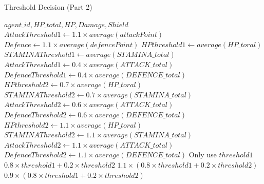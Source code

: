 \begin{algorithm}
\caption{Threshold Decision (Part 2)}\label{alg:12}
\begin{algorithmic} 
\scriptsize
\Require $agent\_id, HP\_total, HP, Damage, Shield$
\State $AttackThreshold1 \leftarrow 1.1 \times average(attackPoint)$
\State $Defence \leftarrow 1.1 \times average(defencePoint)$
\EndIf
{}
\State $HPthreshold1 \leftarrow average(HP\_toral)$
\State $STAMINAThreshold1 \leftarrow average(STAMINA\_total)$
\State $AttackThreshold1 \leftarrow 0.4 \times average(ATTACK\_total)$
\State $DefenceThreshold1 \leftarrow 0.4 \times average(DEFENCE\_total)$
\EndIf
{}
\State $HPthreshold2 \leftarrow 0.7 \times average(HP\_toral)$
\State $STAMINAThreshold2 \leftarrow 0.7 \times average(STAMINA\_total)$
\State $AttackThreshold2 \leftarrow 0.6 \times average(ATTACK\_total)$
\State $DefenceThreshold2 \leftarrow 0.6 \times average(DEFENCE\_total)$
\EndIf
{}
\State $HPthreshold2 \leftarrow 1.1 \times average(HP\_toral)$
\State $STAMINAThreshold2 \leftarrow 1.1 \times average(STAMINA\_total)$
\State $AttackThreshold2 \leftarrow 1.1 \times average(ATTACK\_total)$
\State $DefenceThreshold2 \leftarrow 1.1 \times average(DEFENCE\_total)$
\EndIf
{}
\State Only use $threshold1$
\EndIf
{}
\State $0.8\times threshold1 + 0.2 \times threshold2$
\EndIf
{}
\State $1.1 \times (0.8\times threshold1 + 0.2 \times threshold2)$
\EndIf
{}
\State $0.9 \times (0.8\times threshold1 + 0.2 \times threshold2)$
\EndIf
\end{algorithmic}
\end{algorithm}



